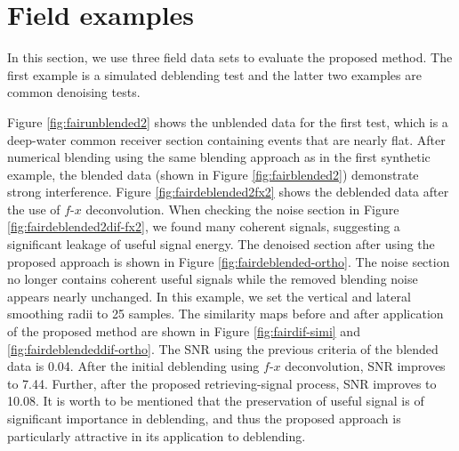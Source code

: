 \section{Field examples}
In this section, we use three field data sets to evaluate the proposed method. The first example is a simulated deblending test and the latter two examples are common denoising tests.%

 Figure \ref{fig:fairunblended2} shows the unblended data for the first test, which is a deep-water common receiver section containing events that are nearly flat. After numerical blending using the same blending approach as in the first synthetic example, the blended data (shown in Figure \ref{fig:fairblended2}) demonstrate strong interference. Figure \ref{fig:fairdeblended2fx2} shows the deblended data after the use of $f$-$x$ deconvolution. When checking the noise section in Figure \ref{fig:fairdeblended2dif-fx2}, we found many coherent signals,  suggesting a significant leakage of useful signal energy. The denoised section after using the proposed approach is shown in Figure \ref{fig:fairdeblended-ortho}. The noise section no longer contains coherent useful signals while the removed blending noise appears nearly unchanged. In this example, we set the vertical and lateral smoothing radii to 25 samples. The similarity maps before and after application of the proposed method are shown in Figure \ref{fig:fairdif-simi} and \ref{fig:fairdeblendeddif-ortho}. The SNR using the previous criteria of the blended data is 0.04. After the initial deblending using $f$-$x$ deconvolution, SNR improves to 7.44. Further, after the proposed retrieving-signal process, SNR improves to 10.08. It is worth to be mentioned that the preservation of useful signal is of significant importance in deblending, and thus the proposed approach is particularly attractive in its application to deblending.

